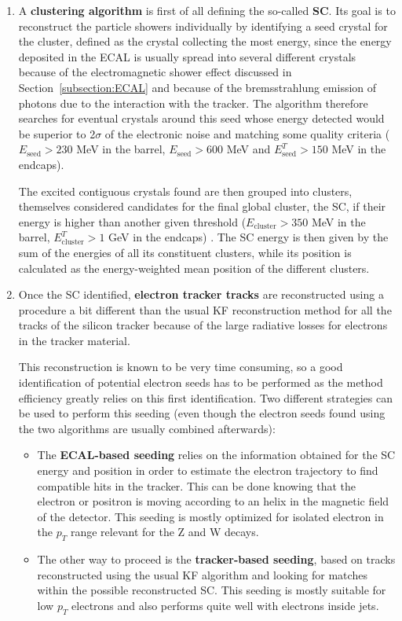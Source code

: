 \documentclass[a4paper, 10pt, openright]{report}
\begin{document}
\begin{enumerate}
\item A \textbf{clustering algorithm} is first of all defining the so-called \textbf{\acf{SC}}. Its goal is to reconstruct the particle showers individually by identifying a seed crystal for the cluster, defined as the crystal collecting the most energy, since the energy deposited in the \ac{ECAL} is usually spread into several different crystals because of the electromagnetic shower effect discussed in Section~\ref{subsection:ECAL} and because of the bremsstrahlung emission of photons due to the interaction with the tracker. The algorithm therefore searches for eventual crystals around this seed whose energy detected would be superior to 2$\sigma$ of the electronic noise and matching some quality criteria ($E_{\text{seed}} > 230$ MeV in the barrel, $E_{\text{seed}} > 600$ MeV and $E_{\text{seed}}^T > 150$ MeV in the endcaps). 

The excited contiguous crystals found are then grouped into clusters, themselves considered candidates for the final global cluster, the \ac{SC}, if their energy is higher than another given threshold ($E_{\text{cluster}} > 350$ MeV in the barrel, $E_{\text{cluster}}^T > 1$ GeV in the endcaps) \cite{EleReco}. The \ac{SC} energy is then given by the sum of the energies of all its constituent clusters, while its position is calculated as the energy-weighted mean position of the different clusters.

\item Once the \ac{SC} identified, \textbf{electron tracker tracks} are reconstructed using a procedure a bit different than the usual \ac{KF} reconstruction method for all the tracks of the silicon tracker \cite{KF} because of the large radiative
losses for electrons in the tracker material. 

This reconstruction is known to be very time consuming, so a good identification of potential electron seeds has to be performed as the method efficiency greatly relies on this first identification. Two different strategies can be used to perform this seeding (even though the electron seeds found using the two algorithms are usually combined afterwards): 

\begin{itemize}
\item The \textbf{\ac{ECAL}-based seeding} relies on the information obtained for the \ac{SC} energy and position in order to estimate the electron trajectory to find compatible hits in the tracker. This can be done knowing that the electron or positron is moving according to an helix in the magnetic field of the detector. This seeding is mostly optimized for isolated electron
in the $p_T$ range relevant for the Z and W decays.
\item The other way to proceed is the \textbf{tracker-based seeding}, based on tracks reconstructed using the usual \ac{KF} algorithm and looking for matches within the possible reconstructed \ac{SC}. This seeding is mostly suitable for low $p_T$ electrons and also performs quite well with electrons inside jets.
\end{itemize}


\end{enumerate}
\end{document}
